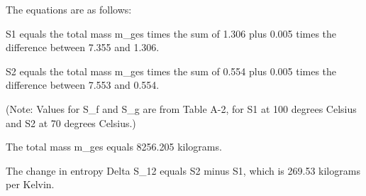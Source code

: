 The equations are as follows:

S1 equals the total mass m_ges times the sum of 1.306 plus 0.005 times the difference between 7.355 and 1.306.

S2 equals the total mass m_ges times the sum of 0.554 plus 0.005 times the difference between 7.553 and 0.554.

(Note: Values for S_f and S_g are from Table A-2, for S1 at 100 degrees Celsius and S2 at 70 degrees Celsius.)

The total mass m_ges equals 8256.205 kilograms.

The change in entropy Delta S_12 equals S2 minus S1, which is 269.53 kilograms per Kelvin.